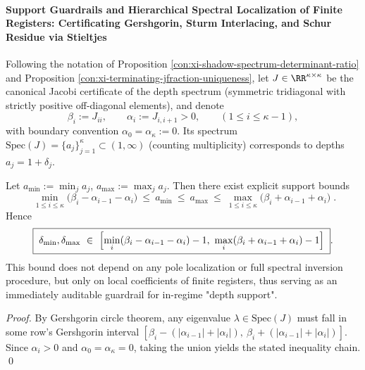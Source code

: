 \paragraph{Support Guardrails and Hierarchical Spectral Localization of Finite Registers: Certificating Gershgorin, Sturm Interlacing, and Schur Residue via Stieltjes}
Following the notation of Proposition \ref{con:xi-shadow-spectrum-determinant-ratio} and Proposition \ref{con:xi-terminating-jfraction-uniqueness},
let \(J\in\RR^{\kappa\times\kappa}\) be the canonical Jacobi certificate of the depth spectrum (symmetric tridiagonal with strictly positive off-diagonal elements), and denote
\[
\beta_i:=J_{ii},
\qquad
\alpha_i:=J_{i,i+1}>0,
\qquad (1\le i\le \kappa-1),
\]
with boundary convention \(\alpha_0=\alpha_\kappa:=0\).
Its spectrum \(\mathrm{Spec}(J)=\{a_j\}_{j=1}^{\kappa}\subset(1,\infty)\) (counting multiplicity) corresponds to depths \(a_j=1+\delta_j\).

\begin{proposition}\label{prop:xi-jacobi-gershgorin-support-guardrail}
Let \(a_{\min}:=\min_j a_j\), \(a_{\max}:=\max_j a_j\).
Then there exist explicit support bounds
\[
\boxed{\;
\min_{1\le i\le \kappa}\bigl(\beta_i-\alpha_{i-1}-\alpha_i\bigr)
\ \le\ a_{\min}\ \le\ a_{\max}\ \le\
\max_{1\le i\le \kappa}\bigl(\beta_i+\alpha_{i-1}+\alpha_i\bigr)\; }.
\]
Hence
\[
\boxed{\;
\delta_{\min},\delta_{\max}\ \in\
\Bigl[\min_{i}(\beta_i-\alpha_{i-1}-\alpha_i)-1,\ \max_{i}(\beta_i+\alpha_{i-1}+\alpha_i)-1\Bigr]\; }.
\]
This bound does not depend on any pole localization or full spectral inversion procedure, but only on local coefficients of finite registers, thus serving as an immediately auditable guardrail for in-regime "depth support".
\end{proposition}
\begin{proof}
By Gershgorin circle theorem, any eigenvalue \(\lambda\in\mathrm{Spec}(J)\) must fall in some row's Gershgorin interval
\(
[\beta_i-(|\alpha_{i-1}|+|\alpha_i|),\ \beta_i+(|\alpha_{i-1}|+|\alpha_i|)]
\).
Since \(\alpha_i>0\) and \(\alpha_0=\alpha_\kappa=0\), taking the union yields the stated inequality chain. \qed
\end{proof}

